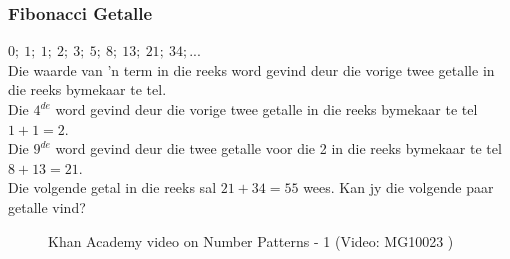 \subsubsection*{Fibonacci Getalle}
$0;~1;~1;~2;~3;~5;~8;~13;~21;~34;...$\\
Die waarde van ’n term in die reeks word gevind deur die vorige twee getalle in die reeks bymekaar te tel.\\
Die $4^{de}$ word gevind deur die vorige twee getalle in die reeks bymekaar te tel $1+1=2$.\\
Die $9^{de}$  word gevind deur die twee
getalle voor die 2 in die reeks bymekaar te tel $8+13=21$.\\
Die volgende getal in die reeks sal $21+34=55$ wees.
Kan jy die volgende paar getalle vind?

\setcounter{subfigure}{0}
\begin{figure}[H] 
\textnormal{Khan Academy video on Number Patterns - 1}\vspace{.1in} \nopagebreak
{} { (Video:  MG10023 )}
\end{figure}       

